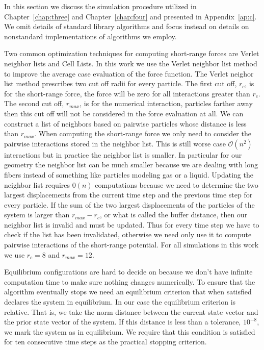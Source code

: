    In this section we discuss the simulation procedure utilized in Chapter~\ref{chap:three} and Chapter~\ref{chap:four} and presented in Appendix~\ref{ap:c}. We omit details of standard library algorithms and focus instead on details on nonstandard implementations of algorithms we employ.

Two common optimization techniques for computing short-range forces are Verlet neighbor lists and Cell Lists.
In this work we use the Verlet neighbor list method to improve the average case evaluation of the force function.
The Verlet neighor list method prescribes two cut off radii for every particle. 
The first cut off, $r_c$, is for the short-range force, the force will be zero for all interactions greater than $r_c$.
The second cut off, $r_{max}$, is for the numerical interaction, particles farther away then this cut off will not be considered in the force evaluation at all.
We can construct a list of neighbors based on pairwise particles whose distance is less than $r_{max}$. 
When computing the short-range force we only need to consider the pairwise interactions stored in the neighbor list. This is still worse case $\mathcal{O}(n^2)$ interactions but in practice the neighbor list is smaller.
In particular for our geometry the neighbor list can be much smaller because we are dealing with long fibers instead of something like particles modeling gas or a liquid.
Updating the neighbor list requires $\mathcal{0}(n)$ computations because we need to determine the two largest displacements from the current time step and the previous time step for every particle.
If the sum of the two largest displacements of the particles of the system is larger than $r_{max} - r_c$, or what is called the buffer distance, then our neighbor list is invalid and must be updated.
Thus for every time step we have to check if the list has been invalidated, otherwise we need only use it to compute pairwise interactions of the short-range potential.
For all simulations in this work we use $r_c = 8$ and $r_{max} = 12$.

   Equilibrium configurations are hard to decide on because we don't have infinite computation time to make sure nothing changes numerically. To ensure that the algorithm eventually stops we need an equilibrium criterion that when satisfied declares the system in equilibrium. In our case the equilibrium criterion is relative. That is, we take the norm distance between the current state vector and the prior state vector of the system. If this distance is less than a tolerance, $10^{-8}$, we mark the system as in equilibrium. We require that this condition is satisfied for ten consecutive time steps as the practical stopping criterion.
   
